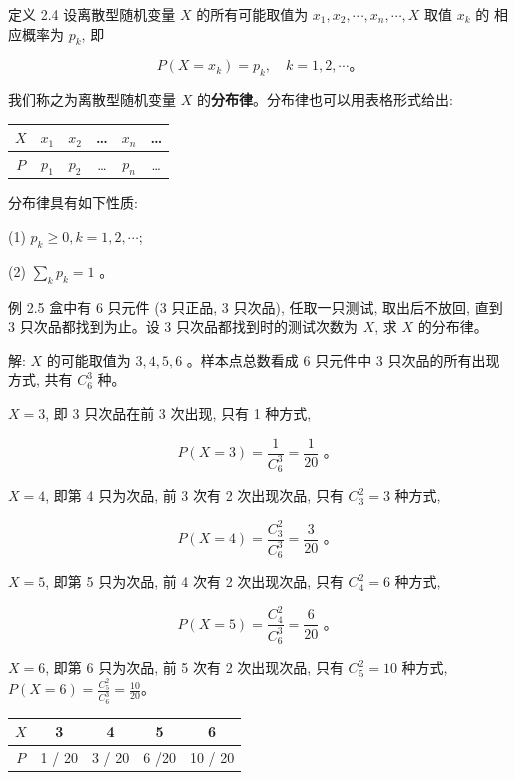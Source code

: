 \documentclass{beamer}
\begin{document}
	\begin{frame}
		定义 2.4 设离散型随机变量 $X$ 的所有可能取值为 $x_{1}, x_{2}, \cdots, x_{n}, \cdots, X$ 取值 $x_{k}$ 的 相应概率为 $p_{k}$, 即
		
		$$
		P\left(X=x_{k}\right)=p_{k}, \quad k=1,2, \cdots 。
		$$
		
		我们称之为离散型随机变量 $X$ 的\textbf{分布律}。分布律也可以用表格形式给出:
		
		\begin{tabular}{c | c c c c c}
			$X$& $x_1$ & $x_2$ & \dots  & $x_n$ & \dots \\
			\hline
			$P$& $p_1$ & $p_2$ & \dots  & $p_n$ & \dots\\
		\end{tabular}
		
		分布律具有如下性质:
		
		(1) $p_{k} \geqslant 0, k=1,2, \cdots$;
		
		(2) $\sum_{k} p_{k}=1$ 。
	\end{frame}
	
	\begin{frame}
		例 2.5 盒中有 6 只元件 (3 只正品, 3 只次品), 任取一只测试, 取出后不放回, 直到 3 只次品都找到为止。设 3 只次品都找到时的测试次数为 $X$, 求 $X$ 的分布律。
	\end{frame}
	
	\begin{frame}
		解: $X$ 的可能取值为 $3,4,5,6$ 。样本点总数看成 6 只元件中 3 只次品的所有出现方式, 共有 $C_{6}^{3}$ 种。
		
		$X=3$, 即 3 只次品在前 3 次出现, 只有 1 种方式,
		
		$$
		P(X=3)=\frac{1}{C_{6}^{3}}=\frac{1}{20} \text { 。 }
		$$
		
		$X=4$, 即第 4 只为次品, 前 3 次有 2 次出现次品, 只有 $C_{3}^{2}=3$ 种方式,
		
		$$
		P(X=4)=\frac{C_{3}^{2}}{C_{6}^{3}}=\frac{3}{20} \text { 。 }
		$$
		
		$X=5$, 即第 5 只为次品, 前 4 次有 2 次出现次品, 只有 $C_{4}^{2}=6$ 种方式,
		
		$$
		P(X=5)=\frac{C_{4}^{2}}{C_{6}^{3}}=\frac{6}{20} \text { 。 }
		$$
		
		$X=6$, 即第 6 只为次品, 前 5 次有 2 次出现次品, 只有 $C_{5}^{2}=10$ 种方式,		
		$
		P(X=6)=\frac{C_{5}^{2}}{C_{6}^{3}}=\frac{10}{20} 。
		$
	\end{frame}
	
	\begin{frame}
		\begin{tabular}{c | c c c c }
			$X$ & 3 & 4 & 5 & 6 \\
			\hline
			$P$ & 1 / 20 & 3 / 20 & 6 /20 & 10 / 20
		\end{tabular}
	\end{frame}
	
\end{document}
